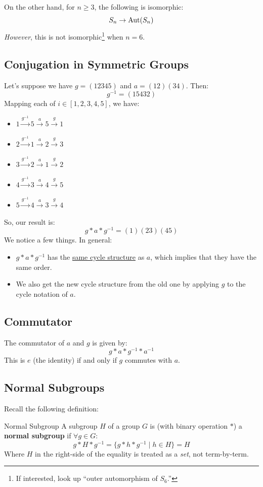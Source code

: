\documentclass[letterpaper]{article}
\begin{document}
\bigskip 

On the other hand, for $n \geq 3$, the following is isomorphic:  
\[S_n \to \operatorname{Aut}(S_n)\]
\emph{However}, this is not isomorphic\footnote{If interested, look up ``outer automorphism of $S_6$.''} when $n = 6$. 

\subsection{Conjugation in Symmetric Groups}
Let's suppose we have $g = (12345)$ and $a = (12)(34)$. Then: 
\[g^{-1} = (15432)\]
Mapping each of $i \in [1, 2, 3, 4, 5]$, we have: 
\begin{itemize}
    \item $1 \xrightarrow{g^{-1}} 5 \xrightarrow{a} 5 \xrightarrow{g} 1$
    \item $2 \xrightarrow{g^{-1}} 1 \xrightarrow{a} 2 \xrightarrow{g} 3$
    \item $3 \xrightarrow{g^{-1}} 2 \xrightarrow{a} 1 \xrightarrow{g} 2$
    \item $4 \xrightarrow{g^{-1}} 3 \xrightarrow{a} 4 \xrightarrow{g} 5$
    \item $5 \xrightarrow{g^{-1}} 4 \xrightarrow{a} 3 \xrightarrow{g} 4$
\end{itemize}
So, our result is: 
\[g * a * g^{-1} = (1)(23)(45)\]
We notice a few things. In general:  
\begin{itemize}
    \item $g * a * g^{-1}$ has the \underline{same cycle structure} as $a$, which implies that they have the same order. 
    \item We also get the new cycle structure from the old one by applying $g$ to the cycle notation of $a$. 
\end{itemize}

\subsection{Commutator}
The commutator of $a$ and $g$ is given by: 
\[g * a * g^{-1} * a^{-1}\]
This is $e$ (the identity) if and only if $g$ commutes with $a$. 

\subsection{Normal Subgroups}
Recall the following definition:
\begin{definition}{Normal Subgroup}{}
    A subgroup $H$ of a group $G$ is (with binary operation $*$) a \textbf{normal subgroup} if $\forall g \in G$:
    \[g * H * g^{-1} = \{g * h * g^{-1} \mid h \in H\} = H\]
    Where $H$ in the right-side of the equality is treated as a \emph{set}, not term-by-term. %
\end{definition}
\end{document}
